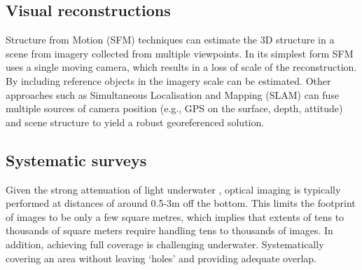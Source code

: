 \subsection{Visual reconstructions}
Structure from Motion (SFM) techniques can estimate the 3D structure in a scene from imagery collected from multiple viewpoints. In its simplest form SFM uses a single moving camera, which results in a loss of scale of the reconstruction. By including reference objects in the imagery scale can be estimated.
Other approaches such as Simultaneous Localisation and Mapping (SLAM) can fuse multiple sources of camera position (e.g., GPS on the surface, depth, attitude) and scene structure to yield a robust georeferenced solution.

\subsection{Systematic surveys}
Given the strong attenuation of light underwater \cite{DUNTLEY_1963}, optical imaging is typically performed at distances of around 0.5-3m off the bottom. This limits the footprint of images to be only a few square metres, which implies that extents of tens to thousands of square meters require handling tens to thousands of images. In addition, achieving full coverage is challenging underwater. Systematically covering an area without leaving `holes' and providing adequate overlap. 

